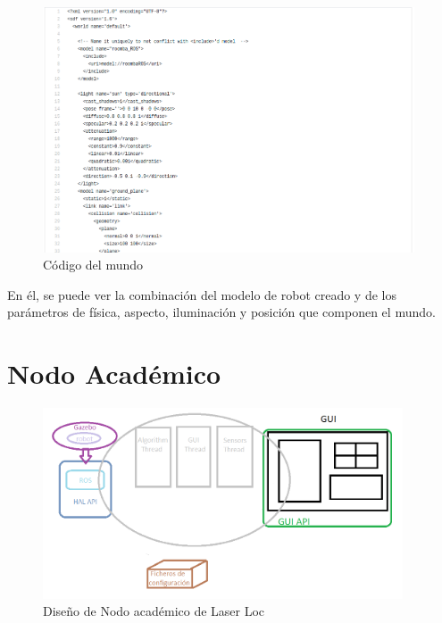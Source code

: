 \begin{figure}[H]
  \begin{center}
    \includegraphics[width=0.98\textwidth]{figures/codeworld.png}
		\caption{Código del mundo}
		\label{fig.codeworld}
		\end{center}
\end{figure}

En él, se puede ver la combinación del modelo de robot creado y de los parámetros de física, aspecto, iluminación y posición que componen el mundo.

\section{Nodo Académico}

\begin{figure}[H]
\begin{center}
	\includegraphics[width=0.95\textwidth]{figures/nodoacademicoll.png}
	\caption{Diseño de Nodo académico de Laser Loc}
	\label{fig.nodoacademicoll}
	\end{center}
\end{figure} 

